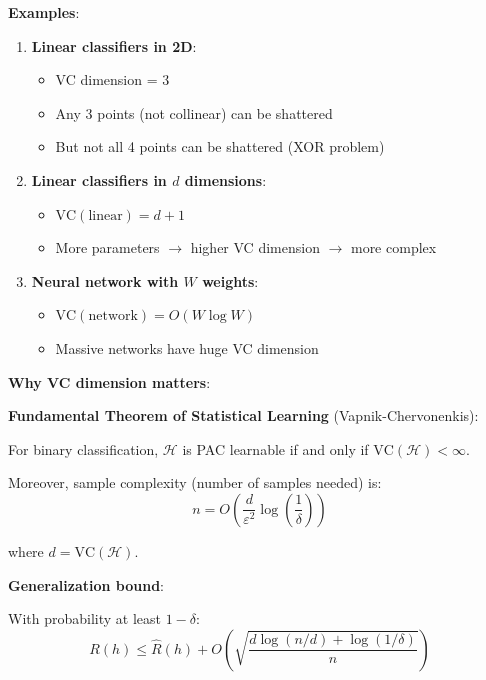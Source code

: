 \documentclass[11pt,oneside]{book}
\begin{document}
\textbf{Examples}:

\begin{enumerate}
    \item \textbf{Linear classifiers in 2D}:
    \begin{itemize}
        \item VC dimension = 3
        \item Any 3 points (not collinear) can be shattered
        \item But not all 4 points can be shattered (XOR problem)
    \end{itemize}

    \item \textbf{Linear classifiers in $d$ dimensions}:
    \begin{itemize}
        \item $\text{VC}(\text{linear}) = d + 1$
        \item More parameters $\rightarrow$ higher VC dimension $\rightarrow$ more complex
    \end{itemize}

    \item \textbf{Neural network with $W$ weights}:
    \begin{itemize}
        \item $\text{VC}(\text{network}) = O(W \log W)$
        \item Massive networks have huge VC dimension
    \end{itemize}
\end{enumerate}

\textbf{Why VC dimension matters}:

\textbf{Fundamental Theorem of Statistical Learning} (Vapnik-Chervonenkis):

For binary classification, $\mathcal{H}$ is PAC learnable if and only if $\text{VC}(\mathcal{H}) < \infty$.

Moreover, sample complexity (number of samples needed) is:
\begin{equation}
n = O\left(\frac{d}{\varepsilon^2} \log\left(\frac{1}{\delta}\right)\right)
\end{equation}

where $d = \text{VC}(\mathcal{H})$.

\textbf{Generalization bound}:

With probability at least $1-\delta$:
\begin{equation}
R(h) \leq \hat{R}(h) + O\left(\sqrt{\frac{d \log(n/d) + \log(1/\delta)}{n}}\right)
\end{equation}
\end{document}

